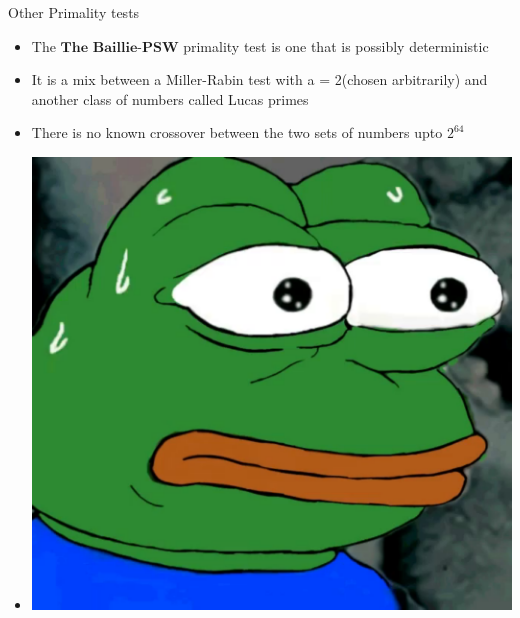 \documentclass{beamer}
\begin{document}
\begin{frame}{Other Primality tests}
    \begin{itemize}
        \item The $\textbf{The Baillie-PSW}$ primality test is one that is possibly deterministic
        \item It is a mix between a Miller-Rabin test with a = 2(chosen arbitrarily) and another class of numbers called Lucas primes
        \item There is no known crossover between the two sets of numbers upto $2^{64}$
        \item \includegraphics[width=\textwidth]{PepeSweat.pdf}
    \end{itemize}
\end{frame}
\end{document}
